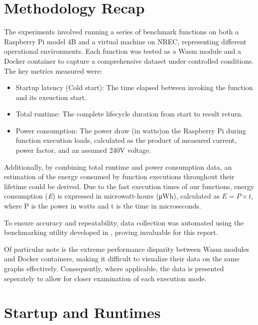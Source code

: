\documentclass[
  table]{report}
\providecommand{\tightlist}{%
  \setlength{\itemsep}{0pt}\setlength{\parskip}{0pt}}
\begin{document}
\section{Methodology Recap}

The experiments involved running a series of benchmark functions on both
a Raspberry Pi model 4B and a virtual machine on \ac{NREC}, representing
different operational environments. Each function was tested as a
\ac{Wasm} module and a Docker container to capture a comprehensive
dataset under controlled conditions. The key metrics measured were:

\begin{itemize}
\tightlist
\item
  Startup latency (Cold start): The time elapsed between invoking the
  function and its exeuction start.
\item
  Total runtime: The complete lifecycle duration from start to result
  return.
\item
  Power consumption: The power draw (in watts)on the Raspberry Pi during
  function execution loads, calculated as the product of measured
  current, power factor, and an assumed 240V voltage.
\end{itemize}

Additionally, by combining total runtime and power consumption data, an
estimation of the energy consumed by function executions throughout
their lifetime could be derived. Due to the fast execution times of our
functions, energy consumption (\emph{E}) is expressed in microwatt-hours
(μWh), calculated as \(E = P
\times t\), where P is the power in watts and t is the time in
microseconds.

To ensure accuracy and repeatability, data collection was automated
using the benchmarking utility developed in
, proving invaluable for this report.

Of particular note is the extreme performance disparity between
\ac{Wasm} modules and Docker containers, making it difficult to
visualize their data on the same graphs effectively. Consequently, where
applicable, the data is presented seperately to allow for closer
examination of each execution mode.

\section{Startup and Runtimes}
\end{document}
